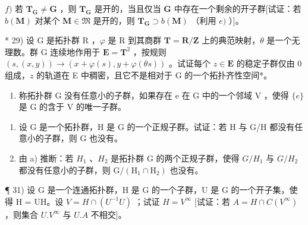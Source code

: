 \(f)\) 若 \(\mathbf{T}_{\mathbf{G}} \neq \mathbf{G}\) ，则 \(\mathbf{T}_{\mathbf{G}}\) 是开的，当且仅当 \(\mathbf{G}\) 中存在一个剩余的开子群{[}试证：若 \(b(\mathbf{M})\) 对某个 \(\mathbf{M} \in \mathfrak{M}\) 是开的，则 \(\mathbf{T}_{\mathbf{G}} \supset b(\mathbf{M})\) （利用 \(e)\) ）{]}。

* 29) 设 G 是拓扑群 R ，\(\varphi\) 是 R 到其商群 \(\mathbf{T} = \mathbf{R} / \mathbf{Z}\) 上的典范映射，\(\theta\) 是一个无理数。群 G 连续地作用于 \(\mathbf{E} = \mathbf{T}^2\) ，按规则 \((s, (x, y)) \to (x + \varphi(s), y + \varphi(\theta s))\) 。试证每个 \(z \in \mathbf{E}\) 的稳定子群仅由 0 组成，\(z\) 的轨道在 E 中稠密，且它不是相对于 G 的一个拓扑齐性空间*。

\begin{enumerate}
\def\labelenumi{\arabic{enumi})}
\setcounter{enumi}{29}
\tightlist
\item
  称拓扑群 G 没有任意小的子群，如果存在 e 在 G 中的一个邻域 V ，使得 \(\{e\}\) 是 G 的含于 V 的唯一子群。
\end{enumerate}

\begin{enumerate}
\def\labelenumi{\alph{enumi})}
\item
  设 G 是一个拓扑群，H 是 G 的一个正规子群。试证：若 H 与 G/H 都没有任意小的子群，则 G 也没有。
\item
  由 a) 推断：若 \(H_{1}\) 、\(H_{2}\) 是拓扑群 G 的两个正规子群，使得 \(G/H_{1}\) 与 \(G/H_{2}\) 都没有任意小的子群，则 \(\mathrm{G}/(\mathrm{H}_{1} \cap \mathrm{H}_{2})\) 也没有。
\end{enumerate}

¶ 31) 设 G 是一个连通拓扑群，H 是 G 的一个子群，U 是 G 的一个开子集，使得 H = UH。设 \(V = H \cap (U^{-1}U)\) ；试证 \(H = V^{\infty}\) {[}试证：若 \(A = H \cap C(V^{\infty})\)，则集合 \(U.V^{\infty}\) 与 \(U.A\) 不相交{]}。

